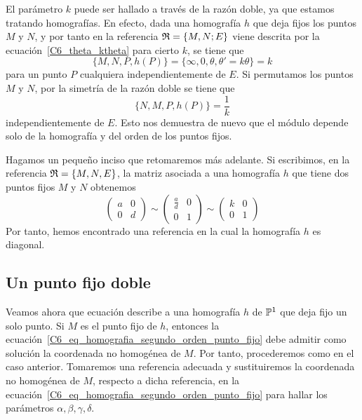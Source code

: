 El parámetro $k$ puede ser hallado a través de la razón doble, ya que estamos tratando homografías. En efecto, dada una homografía $h$ que deja fijos los puntos $M$ y $N$, y por tanto en la referencia $\mathfrak{R}=\{M,N;E\}$ viene descrita por la ecuación~\eqref{C6_theta_ktheta} para cierto $k$, se tiene que
\begin{equation}
	\{M,N,P,h(P)\}=\{\infty,0,\theta,\theta'=k\theta\}=k
\end{equation}
para un punto $P$ cualquiera independientemente de $E$. Si permutamos los puntos $M$ y $N$, por la simetría de la razón doble se tiene que
\begin{equation}
	\{N,M,P,h(P)\}=\frac{1}{k}
\end{equation}
independientemente de $E$. Esto nos demuestra de nuevo que el módulo depende solo de la homografía y del orden de los puntos fijos.

Hagamos un pequeño inciso que retomaremos más adelante. Si escribimos, en la referencia $\mathfrak{R}=\{M,N,E\}$, la matriz asociada a una homografía $h$ que tiene dos puntos fijos $M$ y $N$ obtenemos
\begin{equation*}
	\left( \begin{array}{cc}
	a&0\\
	0&d
	\end{array}\right) 
	\sim \left( \begin{array}{cc}
	\frac{a}{d}&0\\
	0&1
	\end{array}\right) 
	\sim \left( \begin{array}{cc}
	k&0\\
	0&1
	\end{array}\right)
\end{equation*}
Por tanto, hemos encontrado una referencia en la cual la homografía $h$ es diagonal.

\subsection{Un punto fijo doble}
Veamos ahora que ecuación describe a una homografía $h$ de $\mathbb{P}^1$ que deja fijo un solo punto. Si $M$ es el punto fijo de $h$, entonces la ecuación~\eqref{C6_eq_homografia_segundo_orden_punto_fijo} debe admitir como solución la coordenada no homogénea de $M$. Por tanto, procederemos como en el caso anterior. Tomaremos una referencia adecuada y sustituiremos la coordenada no homogénea de $M$, respecto a dicha referencia, en la ecuación~\eqref{C6_eq_homografia_segundo_orden_punto_fijo} para hallar los parámetros $\alpha, \beta,\gamma,\delta$.

